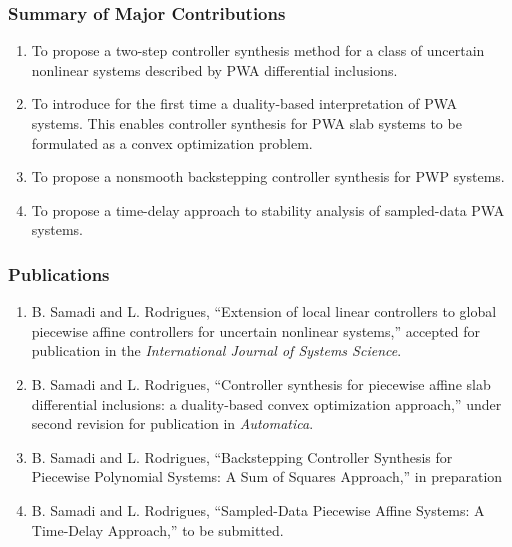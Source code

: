\documentclass{beamer}
\begin{document}
  \frame
  {
    \frametitle{Summary of Major Contributions}
\begin{enumerate}
\item To propose a two-step controller synthesis method for a class of uncertain nonlinear systems described by PWA differential inclusions.
\item To introduce for the first time a duality-based interpretation of PWA systems. This enables controller synthesis for PWA slab systems to be formulated as a convex optimization problem. 
\item To propose a nonsmooth backstepping controller synthesis for PWP systems. 
\item To propose a time-delay approach to stability analysis of sampled-data PWA systems.
\end{enumerate}
}
  \frame
  {
    \frametitle{Publications}

\begin{enumerate}
\item  B. Samadi and L. Rodrigues, ``Extension of local linear controllers to global piecewise affine controllers for uncertain nonlinear systems,'' accepted for publication in the \emph{International Journal of Systems Science}.
\item  B. Samadi and L. Rodrigues, ``Controller synthesis for piecewise affine slab differential inclusions: a duality-based convex optimization approach,'' under second revision for publication in \emph{Automatica}.
\item B. Samadi and L. Rodrigues, ``Backstepping Controller Synthesis for Piecewise Polynomial Systems: A Sum of Squares Approach,'' in preparation
\item B. Samadi and L. Rodrigues, ``Sampled-Data Piecewise Affine Systems: A Time-Delay Approach,'' to be submitted.
\end{enumerate} 
}
\end{document}
